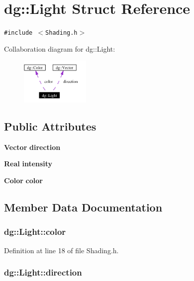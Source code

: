 \section{dg::Light Struct Reference}
\label{structdg_1_1Light}
{\tt \#include $<$Shading.h$>$}

Collaboration diagram for dg::Light:\begin{figure}[H]
\begin{center}
\leavevmode
\includegraphics[width=94pt]{structdg_1_1Light__coll__graph}
\end{center}
\end{figure}
\subsection*{Public Attributes}
\begin{CompactItemize}
\item 
{\bf Vector} {\bf direction}
\item 
{\bf Real} {\bf intensity}
\item 
{\bf Color} {\bf color}
\end{CompactItemize}


\subsection{Member Data Documentation}
\subsubsection{ dg::Light::color}\label{structdg_1_1Light_m2}




Definition at line 18 of file Shading.h.
\subsubsection{ dg::Light::direction}\label{structdg_1_1Light_m0}




